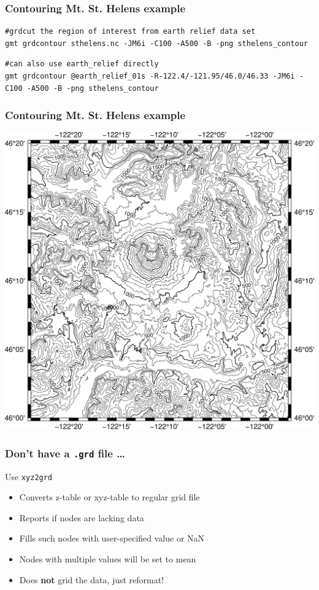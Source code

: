 \documentclass[unknownkeysallowed]{beamer}
\begin{document}
\begin{frame}[fragile=singleslide]
\frametitle{Contouring Mt. St. Helens example}
{\scriptsize
\begin{verbatim}
#grdcut the region of interest from earth relief data set
gmt grdcontour sthelens.nc -JM6i -C100 -A500 -B -png sthelens_contour
\end{verbatim}
}
{\scriptsize
\begin{verbatim}
#can also use earth_relief directly
gmt grdcontour @earth_relief_01s -R-122.4/-121.95/46.0/46.33 -JM6i -C100 -A500 -B -png sthelens_contour
\end{verbatim}
}

\end{frame}

\begin{frame}[fragile=singleslide]
\frametitle{Contouring Mt. St. Helens example}
\begin{center}
	\includegraphics[width=.7\textwidth]{../figures/gmt_sthelens_contours.png}	
\end{center}
\end{frame}

\begin{frame}[fragile=singleslide]
\frametitle{Don't have a {\tt .grd} file \dots}
Use {\tt xyz2grd}
	\begin{itemize}
		\item Converts z-table or xyz-table to regular grid file
		\item Reports if nodes are lacking data
		\item Fills such nodes with user-specified value or NaN
		\item Nodes with multiple values will be set to mean
		\item Does {\bf not} grid the data, just reformat!
	\end{itemize}
\end{frame}
\end{document}

